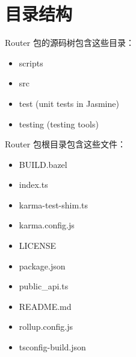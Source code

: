 \section{目录结构}


Router 包的源码树包含这些目录：

\begin{itemize}
  \item scripts
  \item src
  \item test (unit tests in Jasmine)
  \item testing (testing tools)
\end{itemize}


Router 包根目录包含这些文件：

\begin{itemize}
  \item BUILD.bazel
  \item index.ts
  \item karma-test-shim.ts
  \item karma.config.js
  \item LICENSE
  \item package.json
  \item public\_api.ts
  \item README.md
  \item rollup.config.js
  \item tsconfig-build.json
\end{itemize}
